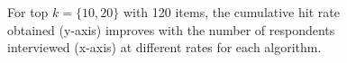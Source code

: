 \documentclass[a4paper,11pt]{article}
\newcommand{\eric}[1]{\textcolor{red}{\textbf{(eric)} #1}}
\newcommand{\fixedexpress}{\textbf{express}}
\newcommand{\egreedy}{$\epsilon$-\textbf{greedy}}
\newcommand{\egreedythres}{$\epsilon$-\textbf{greedythres}}
\newcommand{\ts}{\textbf{TS} }
\newcommand{\edts}{$\epsilon$-$\delta$-\textbf{diffuse TS} }
\newcommand{\tsthres}{\textbf{TS-thres} }
\newcommand{\edtsthres}{$\epsilon$-$\delta$-\textbf{TS-thres} }
\begin{document}
\begin{figure}%
    \caption{For top $k=\{10,20\}$ with 120 items, the cumulative hit rate obtained (y-axis) improves with the number of respondents interviewed (x-axis) at different rates for each algorithm.}%
    \label{fig:K120_L20_k3hit_k10hit}%
 	\begin{center}
    \qquad
	\end{center}
\end{figure}
\end{document}
